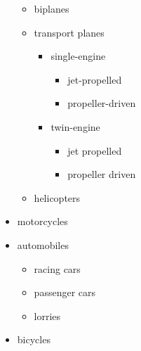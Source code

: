 \begin{Example}
\begin{ShowOutput}[\baselineskip]
\begin{itemize}
          \begin{itemize}
          \item biplanes
          \item transport planes
            \begin{itemize}
            \item single-engine
              \begin{itemize}
              \item jet-propelled
              \item propeller-driven
              \end{itemize}
            \item twin-engine
              \begin{itemize}
              \item jet propelled
              \item propeller driven
              \end{itemize}
            \end{itemize}
          \item helicopters
          \end{itemize}
        \item motorcycles
        \item automobiles
          \begin{itemize}
          \item racing cars
          \item passenger cars
          \item lorries
          \end{itemize}
        \item bicycles
        \end{itemize}
      \end{ShowOutput}
    \end{Example}
  \fi
  \EndIndexGroup


